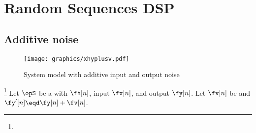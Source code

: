 \chapter{Random Sequences DSP}
\section{Additive noise}
\begin{figure}
  \centering%
  \texttt{[image: graphics/xhyplusv.pdf]}
  \caption{System model with additive input and output noise\label{fig:xhyplusv}}
\end{figure}
\begin{proposition}
\footnote{
  }
\label{prop:Swxyv}
Let $\opS$ be a  with  $\fh[n]$,
input $\fx[n]$, and output $\fy[n]$.
Let $\fv[n]$ be  and $\fy'[n]\eqd\fy[n]+\fv[n]$.
\end{proposition}
